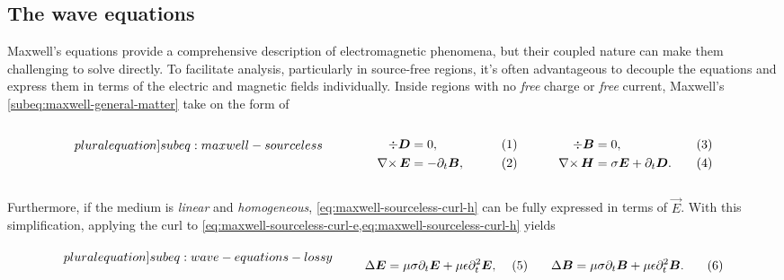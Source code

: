 \documentclass[11pt,a4paper,twoside,openany]{report}
\begin{document}
\subsection{The wave equations}
\label{subsection:the-wave-equations}
Maxwell's equations provide a comprehensive description of electromagnetic phenomena, but their coupled nature can make them challenging to solve directly. To facilitate analysis, particularly in source-free regions, it's often advantageous to decouple the equations and express them in terms of the electric and magnetic fields individually. Inside regions with no \emph{free} charge or \emph{free} current, Maxwell's \cref{subeq:maxwell-general-matter} take on the form of\\
\begin{subequations}
    \label[pluralequation]{subeq:maxwell-sourceless}
    \noindent\centering
    \begin{minipage}{0.45\textwidth}
        \begin{align}
            \label{eq:maxwell-sourceless-div-d}
            \div \vec D &= 0,
        \\
            \label{eq:maxwell-sourceless-curl-e}
            \curl \vec E &= -\partial_t\vec B,
        \end{align}
    \end{minipage}
    \hfill
    \begin{minipage}{0.45\textwidth}
        \begin{align}
            \label{eq:maxwell-sourceless-div-b}
            \div\vec B &= 0,
        \\
            \label{eq:maxwell-sourceless-curl-h}
            \curl\vec H &= \sigma\vec E + \partial_t\vec D.
        \end{align}
    \end{minipage}\bigskip
\end{subequations}\\
Furthermore, if the medium is \emph{linear} and \emph{homogeneous}, \cref{eq:maxwell-sourceless-curl-h} can be fully expressed in terms of $\vec E$. With this simplification, applying the curl to \cref{eq:maxwell-sourceless-curl-e,eq:maxwell-sourceless-curl-h} yields\\
\begin{subequations}
    \label[pluralequation]{subeq:wave-equations-lossy}
    \noindent\centering
    \begin{minipage}{0.45\textwidth}
        \begin{align}
            \label{eq:wave-equation-e}
            \Delta\vec E &= \mu\sigma\partial_t\vec E + \mu\epsilon\partial^2_t\vec E,
        \end{align}
    \end{minipage}
    \hfill
    \begin{minipage}{0.45\textwidth}
        \begin{align}
            \label{eq:wave-equation-b}
            \Delta\vec B &= \mu\sigma\partial_t\vec B + \mu\epsilon\partial^2_t\vec B.
        \end{align}
    \end{minipage}\bigskip
\end{subequations}
\end{document}
